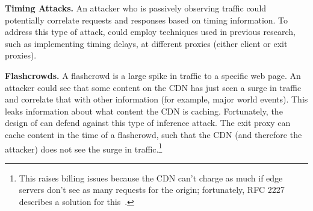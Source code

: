 \textbf{Timing Attacks.} An attacker who is passively observing traffic could potentially 
correlate requests and responses based on timing information.  To address this type of attack, 
\system{} could employ techniques used in previous research, such as implementing timing 
delays, at different proxies (either client or exit proxies).

\textbf{Flashcrowds.}  A flashcrowd is a large spike in traffic to a specific web
page. An attacker
could see that some content on the CDN has just seen a surge in traffic and correlate that with 
other information (for example, major world events).  This leaks information about what content the 
CDN is caching.  Fortunately, the design of \system{} can defend against this type of inference attack.  
The exit proxy can cache content in the time of a flashcrowd, such that the CDN (and therefore the attacker) 
does not see the surge in traffic.\footnote{This raises billing issues because the CDN can’t charge as much if edge servers don’t see as many requests for the origin; fortunately, RFC 2227 describes a solution for this~\cite{rfc2227}.}  

